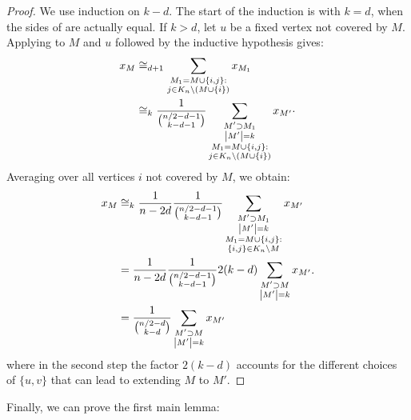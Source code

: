 \begin{proof}
We use induction on \(k - d\).
The start of the induction is with \(k = d\),
when the sides of 
are actually equal. If \(k > d\), let \(u\) be a fixed vertex not covered by \(M\).
Applying  to \(M\) and \(u\)
followed by the inductive hypothesis gives:
\begin{equation*}
	\begin{split}
    x_{M}
    &\cong_{d+1}
    \sum_{\substack{M_{1} = M \cup \{i,j\}: \\
        j \in K_{n} \setminus (M \cup \{i\})}}
    x_{M_{1}} \\
    &\cong_k
    \frac{1}{\binom{n/2 - d - 1}{k - d - 1}}
    \sum_{\substack{
        M' \supset M_{1} \\ \left|M'\right| = k \\
        M_{1} = M \cup \{i,j\}: \\
        j \in K_{n} \setminus (M \cup \{i\})}}
    x_{M'}
    \end{split}
    .
\end{equation*}
Averaging over all vertices \(i\) not covered by \(M\),
we obtain:
\begin{equation*}
  \begin{split}
  x_{M}
  &\cong_k
  \frac{1}{n - 2 d}
  \frac{1}{\binom{n/2 - d - 1}{k - d - 1}}
  \sum_{\substack{
      M' \supset M_{1} \\ \left|M'\right| = k \\
      M_{1} = M \cup \{i,j\}: \\
      \{i,j\} \in K_{n} \setminus M}}
  x_{M'} \\
  &=
  \frac{1}{n - 2 d}
  \frac{1}{\binom{n/2 - d - 1}{k - d - 1}}
  2 (k - d)
  \sum_{\substack{
      M' \supset M \\ \left|M'\right| = k}}
  x_{M'} \\
  &=
  \frac{1}{\binom{n/2 - d}{k - d}}
  \sum_{\substack{M' \supset M \\ \left|M'\right| = k}}
  x_{M'}
  \end{split}
  .
\end{equation*}
where in the second step the factor \(2(k - d)\) accounts for the different choices of $\{u,v\}$ that can lead to extending $M$ to $M'$.
\end{proof}
Finally, we can prove the first main lemma:

